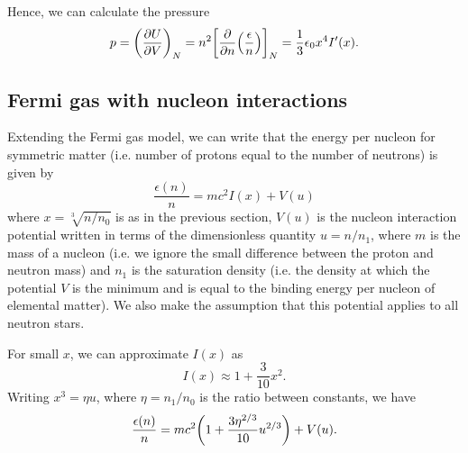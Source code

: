 \documentclass[draft,11pt]{article}
\theoremstyle{definition}
\theoremstyle{remark}
\begin{document}
            Hence, we can calculate the pressure \begin{equation}\label{eq/fermi/pressure}p=\qty(\pdv{U}{V})_{N}=n^{2}\qty[\pdv{n}(\frac{\epsilon}{n})]_{N}=\frac{1}{3}\epsilon_{0}x^{4}I'(x).\end{equation}

        
        \subsection{Fermi gas with nucleon interactions}
            Extending the Fermi gas model, we can write that the energy per nucleon for symmetric matter (i.e. number of protons equal to the number of neutrons) is given by \parencite{silbar.reddy.2004/neutron.stars} \[\frac{\epsilon(n)}{n}=mc^{2}I(x)+V(u)\] where $x=\sqrt[3]{n/n_{0}}$ is as in the previous section, $V(u)$ is the nucleon interaction potential written in terms of the dimensionless quantity $u=n/n_{1}$, where $m$ is the mass of a nucleon (i.e. we ignore the small difference between the proton and neutron mass) and $n_{1}$ is the saturation density (i.e. the density at which the potential $V$ is the minimum and is equal to the binding energy per nucleon of elemental matter). We also make the assumption that this potential applies to all neutron stars. %
            
            For small $x$, we can approximate $I(x)$ as \[I(x)\approx1+\frac{3}{10}x^{2}.\] Writing $x^{3}=\eta u$, where $\eta=n_{1}/n_{0}$ is the ratio between constants, we have \begin{equation}\label{eq/symmetric.energy}\frac{\epsilon(n)}{n}=mc^{2}\qty(1+\frac{3\eta^{2/3}}{10}u^{2/3})+V(u).\end{equation} %
            
\end{document}

